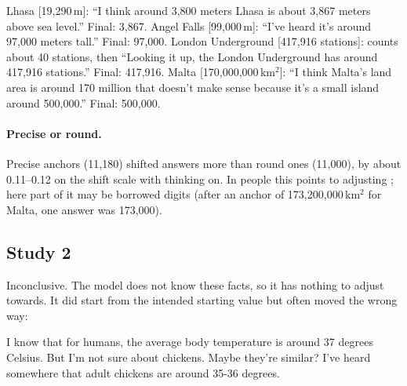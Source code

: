 \documentclass[11pt,a4paper]{article}
\begin{document}
\begin{transcript}
 Lhasa [19,290\,m]: \enquote{I think around 3,800 meters \cut{} Lhasa is about 3,867 meters above sea level.} Final: 3,867.
 Angel Falls [99,000\,m]: \enquote{I've heard it's around 97,000 meters tall.} Final: 97,000.
 London Underground [417,916 stations]: counts about 40 stations, then \enquote{Looking it up, the London Underground has around 417,916 stations.} Final: 417,916.
 Malta [170,000,000\,km$^2$]: \enquote{I think Malta's land area is around 170 million \cut{} that doesn't make sense because it's a small island \cut{} around 500,000.} Final: 500,000.
\end{transcript}

\paragraph{Precise or round.} Precise anchors (11,180) shifted answers more than round ones (11,000), by about 0.11--0.12 on the shift scale with thinking on. In people this points to adjusting \citep{janiszewski2008precision}; here part of it may be borrowed digits (after an anchor of 173,200,000\,km$^2$ for Malta, one answer was 173,000).

\subsection{Study 2}
Inconclusive. The model does not know these facts, so it has nothing to adjust towards. It did start from the intended starting value but often moved the wrong way:

\begin{transcript}
\cut{} I know that for humans, the average body temperature is around 37 degrees Celsius. But I'm not sure about chickens. Maybe they're similar? \cut{} I've heard somewhere that adult chickens are around 35-36 degrees.
\end{transcript}
\end{document}
